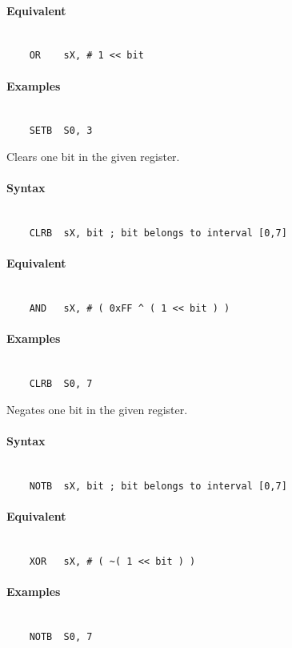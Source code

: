     \paragraph{Equivalent}
        ~\\
        \verb'    OR    sX, # 1 << bit'

    \paragraph{Examples}
        ~\\
        \verb'    SETB  S0, 3'

    Clears one bit in the given register.

    \paragraph{Syntax}
        ~\\
        \verb'    CLRB  sX, bit ; bit belongs to interval [0,7]'

    \paragraph{Equivalent}
        ~\\
        \verb'    AND   sX, # ( 0xFF ^ ( 1 << bit ) )'

    \paragraph{Examples}
        ~\\
        \verb'    CLRB  S0, 7'

    Negates one bit in the given register.

    \paragraph{Syntax}
        ~\\
        \verb'    NOTB  sX, bit ; bit belongs to interval [0,7]'

    \paragraph{Equivalent}
        ~\\
        \verb'    XOR   sX, # ( ~( 1 << bit ) )'

    \paragraph{Examples}
        ~\\
        \verb'    NOTB  S0, 7'

